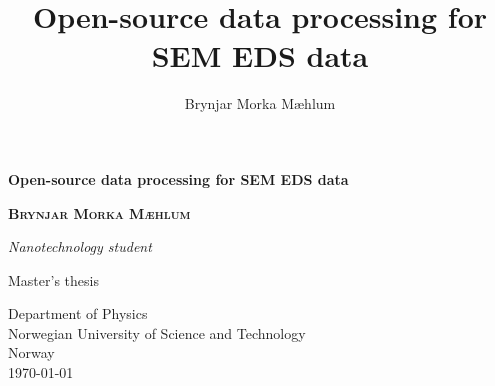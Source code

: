 \title{Open-source data processing for SEM EDS data}
\author{Brynjar Morka Mæhlum}

\begin{titlepage}
    \begin{center}
        \pagecolor{titlepaperbg}  %
        \color{titletext}  %
        \vspace*{5cm}


        \textbf{\Huge \color{titletext} Open-source data processing for SEM EDS data}
        \vspace{3.5cm}

        \textbf{\Large \scshape Brynjar Morka Mæhlum}

        \vspace{0.2cm}
        \textit{Nanotechnology student}

        \vspace{1.5cm}

        \vfill

        Master's thesis

        \vspace{0.5cm}


        Department of Physics \\
        Norwegian University of Science and Technology \\
        Norway \\
        \today

    \end{center}
\end{titlepage}